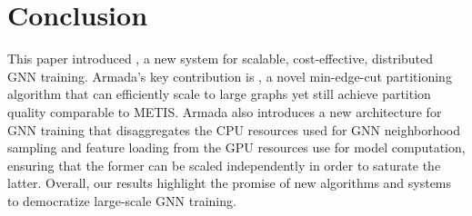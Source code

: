 \vspace{0.05in}
\section{Conclusion}
\label{sec:conclusion}
This paper introduced \systemname, a new system for scalable, cost-effective, distributed GNN training. Armada's key contribution is \partitioning, a novel min-edge-cut partitioning algorithm that can efficiently scale to large graphs yet still achieve partition quality comparable to METIS. Armada also introduces a new architecture for GNN training that disaggregates the CPU resources used for GNN neighborhood sampling and feature loading from the GPU resources use for model computation, ensuring that the former can be scaled independently in order to saturate the latter. Overall, our results highlight the promise of new algorithms and systems to democratize large-scale GNN training.